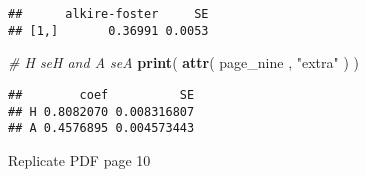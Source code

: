 \documentclass[]{book}
\newenvironment{Shaded}{\begin{snugshade}}{\end{snugshade}}
\newcommand{\KeywordTok}[1]{\textcolor[rgb]{0.13,0.29,0.53}{\textbf{{#1}}}}
\newcommand{\StringTok}[1]{\textcolor[rgb]{0.31,0.60,0.02}{{#1}}}
\newcommand{\CommentTok}[1]{\textcolor[rgb]{0.56,0.35,0.01}{\textit{{#1}}}}
\newcommand{\NormalTok}[1]{{#1}}
\begin{document}
\begin{verbatim}
##      alkire-foster     SE
## [1,]       0.36991 0.0053
\end{verbatim}

\begin{Shaded}
\begin{Highlighting}[]
\CommentTok{# H seH and A seA}
\KeywordTok{print}\NormalTok{( }\KeywordTok{attr}\NormalTok{( page_nine , }\StringTok{"extra"} \NormalTok{) )}
\end{Highlighting}
\end{Shaded}

\begin{verbatim}
##        coef          SE
## H 0.8082070 0.008316807
## A 0.4576895 0.004573443
\end{verbatim}

Replicate PDF page 10
\end{document}
